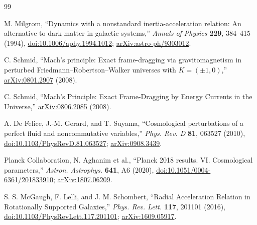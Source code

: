 \documentclass[11pt]{article}
\begin{document}
\begin{thebibliography}{99}

M. Milgrom,
``Dynamics with a nonstandard inertia-acceleration relation: An alternative to dark matter in galactic systems,''
\textit{Annals of Physics} \textbf{229}, 384--415 (1994),
\href{https://doi.org/10.1006/aphy.1994.1012}{doi:10.1006/aphy.1994.1012};
\href{https://arxiv.org/abs/astro-ph/9303012}{arXiv:astro-ph/9303012}.

C. Schmid,
``Mach's principle: Exact frame-dragging via gravitomagnetism in perturbed Friedmann--Robertson--Walker universes with $K=(\pm1,0)$,''
\href{https://arxiv.org/abs/0801.2907}{arXiv:0801.2907} (2008).

C. Schmid,
``Mach's Principle: Exact Frame-Dragging by Energy Currents in the Universe,''
\href{https://arxiv.org/abs/0806.2085}{arXiv:0806.2085} (2008).

A. De Felice, J.-M. Gerard, and T. Suyama,
``Cosmological perturbations of a perfect fluid and noncommutative variables,''
\textit{Phys. Rev. D} \textbf{81}, 063527 (2010),
\href{https://doi.org/10.1103/PhysRevD.81.063527}{doi:10.1103/PhysRevD.81.063527};
\href{https://arxiv.org/abs/0908.3439}{arXiv:0908.3439}.


Planck Collaboration, N. Aghanim et al.,
``Planck 2018 results. VI. Cosmological parameters,''
\textit{Astron. Astrophys.} \textbf{641}, A6 (2020),
\href{https://doi.org/10.1051/0004-6361/201833910}{doi:10.1051/0004-6361/201833910};
\href{https://arxiv.org/abs/1807.06209}{arXiv:1807.06209}.

S. S. McGaugh, F. Lelli, and J. M. Schombert,
``Radial Acceleration Relation in Rotationally Supported Galaxies,''
\textit{Phys. Rev. Lett.} \textbf{117}, 201101 (2016),
\href{https://doi.org/10.1103/PhysRevLett.117.201101}{doi:10.1103/PhysRevLett.117.201101};
\href{https://arxiv.org/abs/1609.05917}{arXiv:1609.05917}.

\end{thebibliography}
\end{document}
